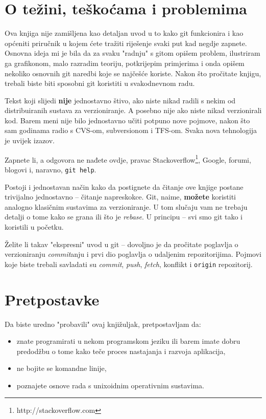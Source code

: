 \section*{O težini, teškoćama i problemima}

Ova knjiga nije zamišljena kao detaljan uvod u to kako git funkcionira i kao općeniti priručnik u kojem ćete tražiti riješenje svaki put kad negdje zapnete.
Osnovna ideja mi je bila da za svaku "radnju" s gitom opišem problem, ilustriram ga grafikonom, malo razradim teoriju, potkrijepim primjerima i onda opišem nekoliko osnovnih git naredbi koje se najčešće koriste.
Nakon što pročitate knjigu, trebali biste biti sposobni git koristiti u svakodnevnom radu. 

Tekst koji slijedi \textbf{nije} jednostavno štivo, ako niste nikad radili s nekim od distribuiranih sustava za verzioniranje.
A posebno nije ako niste nikad verzionirali kod.
Barem meni nije bilo jednostavno učiti potpuno nove pojmove, nakon što sam godinama radio s CVS-om, subversionom i TFS-om.
Svaka nova tehnologija je uvijek izazov.

Zapnete li, a odgovora ne nađete ovdje, pravac Stackoverflow\footnote{http://stackoverflow.com}, Google, 
forumi, blogovi i, naravno, \verb+git help+.

Postoji i jednostavan način kako da postignete da čitanje ove knjige postane trivijalno jednostavno -- čitanje napreskokce.
Git, naime, \textbf{možete} koristiti analogno klasičnim sustavima za verzioniranje. 
U tom slučaju vam ne trebaju detalji o tome kako se grana ili što je \emph{rebase}.
U principu -- svi smo git tako i koristili u početku.

Želite li takav "ekspresni" uvod u git -- dovoljno je da pročitate poglavlja o verzioniranju \emph{commit}anju i prvi dio poglavlja o udaljenim repozitorijima.
Pojmovi koje biste trebali savladati su \emph{commit}, \emph{push}, \emph{fetch}, konflikt i \verb+origin+ repozitorij.

\section*{Pretpostavke}

Da biste uredno "probavili" ovaj knjižuljak, pretpostavljam da:

\begin{itemize}
	\item znate programirati u nekom programskom jeziku ili barem imate dobru predodžbu o tome kako teče proces nastajanja i razvoja aplikacija,
	\item ne bojite se komandne linije,
	\item poznajete osnove rada s unixoidnim operativnim sustavima.
\end{itemize}

